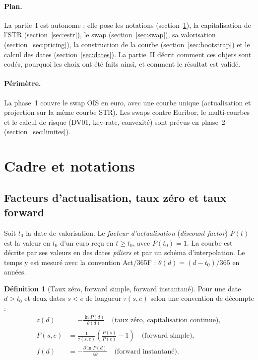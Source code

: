\documentclass[11pt,a4paper]{article}
\newcommand{\estr}{\texorpdfstring{\texteuro STR}{EUR STR}}
\newcommand{\DF}[1]{P(#1)}
\theoremstyle{plain}
\theoremstyle{definition}
\newtheorem{definition}{Définition}
\theoremstyle{remark}
\begin{document}
\paragraph{Plan.} La partie~I est autonome : elle pose les notations (section~\ref{sec:notations}),
la capitalisation de l'\estr{} (section~\ref{sec:estr}), le swap (section~\ref{sec:swap}), sa
valorisation (section~\ref{sec:pricing}), la construction de la courbe (section~\ref{sec:bootstrap})
et le calcul des dates (section~\ref{sec:dates}). La partie~II décrit comment ces objets sont codés,
pourquoi les choix ont été faits ainsi, et comment le résultat est validé.

\paragraph{Périmètre.} La phase~1 couvre le swap OIS en euro, avec une courbe unique (actualisation
et projection sur la même courbe \estr{}). Les swaps contre Euribor, le multi-courbes et le calcul
de risque (DV01, key-rate, convexité) sont prévus en phase~2 (section~\ref{sec:limites}).

\section{Cadre et notations}\label{sec:notations}

\subsection{Facteurs d'actualisation, taux zéro et taux forward}

Soit $t_0$ la date de valorisation. Le \emph{facteur d'actualisation} (\emph{discount factor}) $\DF{t}$
est la valeur en $t_0$ d'un euro reçu en $t\ge t_0$, avec $\DF{t_0}=1$. La courbe est décrite par
ses valeurs en des dates \emph{piliers} et par un schéma d'interpolation. Le temps y est mesuré avec
la convention Act/365F : $\theta(d)=(d-t_0)/365$ en années.

\begin{definition}[Taux zéro, forward simple, forward instantané]
Pour une date $d>t_0$ et deux dates $s<e$ de longueur $\tau(s,e)$ selon une convention de décompte :
\begin{align}
  z(d) &= -\frac{\ln \DF{d}}{\theta(d)}\quad\text{(taux zéro, capitalisation continue)},\\
  F(s,e) &= \frac{1}{\tau(s,e)}\left(\frac{\DF{s}}{\DF{e}}-1\right)\quad\text{(forward simple)},
  \label{eq:forward}\\
  f(d) &= -\frac{\partial \ln \DF{d}}{\partial \theta}\quad\text{(forward instantané)}.
\end{align}
\end{definition}
\end{document}
